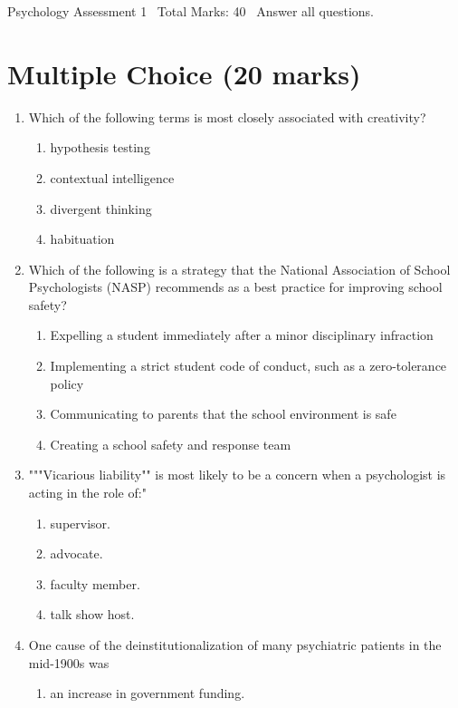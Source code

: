 \documentclass[12pt]{article}
\begin{document}
\begin{center}
Psychology Assessment 1 \
Total Marks: 40 \
Answer all questions.
\end{center}

\section*{Multiple Choice (20 marks)}
\begin{enumerate}[label=\arabic*.]
\item Which of the following terms is most closely associated with creativity?
\begin{enumerate}[label=(\alph*)]
    \item hypothesis testing
    \item contextual intelligence
    \item divergent thinking
    \item habituation
\end{enumerate}
\item Which of the following is a strategy that the National Association of School Psychologists (NASP) recommends as a best practice for improving school safety?
\begin{enumerate}[label=(\alph*)]
    \item Expelling a student immediately after a minor disciplinary infraction
    \item Implementing a strict student code of conduct, such as a zero-tolerance policy
    \item Communicating to parents that the school environment is safe
    \item Creating a school safety and response team
\end{enumerate}
\item """Vicarious liability"" is most likely to be a concern when a psychologist is acting in the role of:"
\begin{enumerate}[label=(\alph*)]
    \item supervisor.
    \item advocate.
    \item faculty member.
    \item talk show host.
\end{enumerate}
\item One cause of the deinstitutionalization of many psychiatric patients in the mid-1900s was
\begin{enumerate}[label=(\alph*)]
    \item an increase in government funding.

\end{enumerate}
\end{enumerate}
\end{document}
